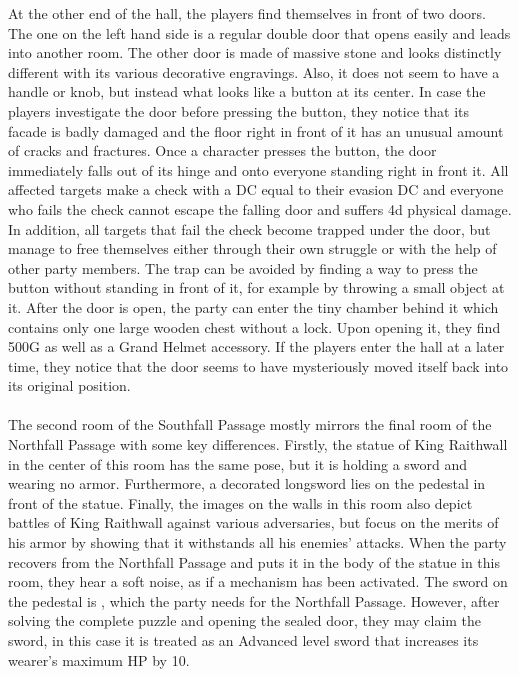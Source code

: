 %
\ofpar
%
At the other end of the hall, the players find themselves in front of two doors.
The one on the left hand side is a regular double door that opens easily and leads into another room.
The other door is made of massive stone and looks distinctly different with its various decorative engravings.
Also, it does not seem to have a handle or knob, but instead what looks like a button at its center.
In case the players investigate the door before pressing the button, they notice that its facade is badly damaged and the floor right in front of it has an unusual amount of cracks and fractures.
Once a character presses the button, the door immediately falls out of its hinge and onto everyone standing right in front it.
All affected targets make a check with a DC equal to their evasion DC and everyone who fails the check cannot escape the falling door and suffers 4d physical damage.
In addition, all targets that fail the check become trapped under the door, but manage to free themselves either through their own struggle or with the help of other party members.
The trap can be avoided by finding a way to press the button without standing in front of it, for example by throwing a small object at it.
After the door is open, the party can enter the tiny chamber behind it which contains only one large wooden chest without a lock.
Upon opening it, they find 500G as well as a Grand Helmet accessory.
If the players enter the hall at a later time, they notice that the door seems to have mysteriously moved itself back into its original position. 
%
\ofpar
%
\\\\
%
The second room of the Southfall Passage mostly mirrors the final room of the Northfall Passage with some key differences.
Firstly, the statue of King Raithwall in the center of this room has the same pose, but it is holding a sword and wearing no armor.
Furthermore, a decorated longsword lies on the pedestal in front of the statue.
Finally, the images on the walls in this room also depict battles of King Raithwall against various adversaries, but focus on the merits of his armor by showing that it withstands all his enemies' attacks.
When the party recovers  from the Northfall Passage and puts it in the body of the statue in this room, they hear a soft noise, as if a mechanism has been activated.
The sword on the pedestal is , which the party needs for the Northfall Passage.
However, after solving the complete puzzle and opening the sealed door, they may claim the sword, in this case it is treated as an Advanced level sword that increases its wearer's maximum HP by 10.
